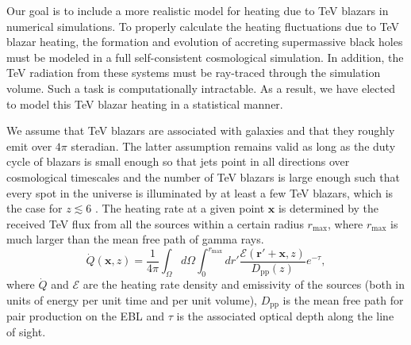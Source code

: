 \documentclass[numberedappendix]{emulateapj}
\begin{document}
Our goal is to include a more realistic model for heating due to TeV blazars in numerical simulations.
To properly calculate the heating fluctuations due to TeV blazar heating, the formation and evolution of accreting supermassive black holes must be modeled in a full self-consistent cosmological simulation. In addition, the TeV radiation from these systems must be ray-traced through the simulation volume. Such a task is computationally intractable. As a result, we have elected to model this TeV blazar heating in a statistical manner.

We assume that TeV blazars are associated with galaxies and that they roughly emit over $4\pi$ steradian. The latter assumption remains valid as long as the duty cycle of blazars is small enough so that jets point in all directions over cosmological timescales and the number of TeV blazars is large enough such that every spot in the universe is illuminated by at least a few TeV blazars, which is the case for $z\lesssim 6$ \citep{2012ApJ...752...23C}.
The heating rate at a given point $\mathbf{x}$ is determined by the received TeV flux from all the sources within a certain radius $r_{\mathrm{max}}$, where $r_{\mathrm{max}}$ is much larger than the mean free path of gamma rays.
\begin{equation}
\label{eq:heating_rate}
\dot{Q}(\mathbf{x},z)= \frac{1}{4\pi} \int_{\Omega} d\Omega\int_0^{r_{\mathrm{max}}} dr'\frac{\mathcal{E}(\mathbf{r}'+\mathbf{x},z)}{D_{\mathrm{pp}}(z)} e^{-\tau},
\end{equation}
where $\dot{Q}$ and $\mathcal{E}$ are the heating rate density and emissivity of the sources (both in units of energy per unit time and per unit volume), $D_{\mathrm{pp}}$ is the mean free path for pair production on the EBL and $\tau$ is the associated optical depth along the line of sight.
\end{document}
